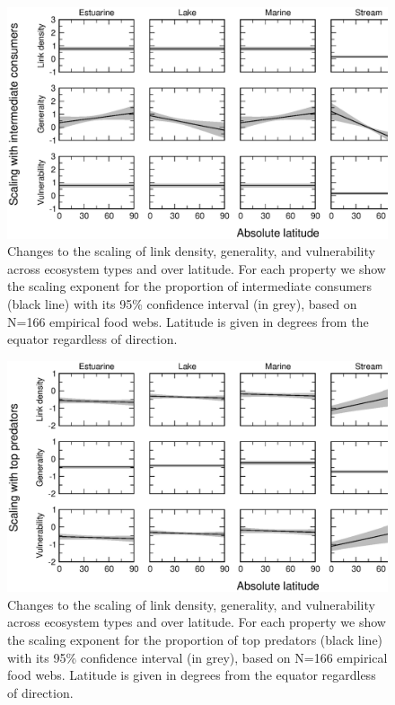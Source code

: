 \documentclass[12pt]{article}
\begin{document}
\begin{figure}[h]
\centerline{\includegraphics*[width=.8\textwidth]{Figures/by_TL/marginal/I_marginal_latitude_proportions.eps}}
\caption{Changes to the scaling of link density, generality, and vulnerability across ecosystem
types and over latitude. For each property we show the scaling exponent for the proportion of
intermediate consumers (black line) with its 95\% confidence interval (in grey), based on 
N=166 empirical food webs. Latitude is given in degrees
from the equator regardless of direction.}
\label{I}
\end{figure}

\begin{figure}[!h]
\centerline{\includegraphics*[width=.8\textwidth]{Figures/by_TL/marginal/T_marginal_latitude_proportions.eps}}
\caption{Changes to the scaling of link density, generality, and vulnerability across ecosystem
types and over latitude. For each property we show the scaling exponent for the proportion of
top predators (black line) with its 95\% confidence interval (in grey), based on N=166 
empirical food webs. Latitude is given in degrees
from the equator regardless of direction.}
\label{T}
\end{figure}


\newpage


\end{document}
